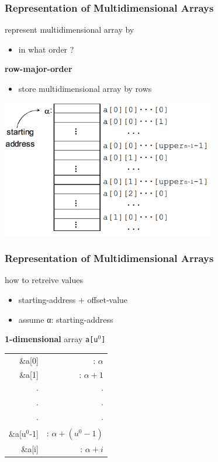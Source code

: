 \documentclass[newPxFont,sthlmFooter,nooffset]{beamer}
\begin{document}
\begin{frame}[t, fragile]
  \frametitle{Representation of Multidimensional Arrays}
represent multidimensional array by
\begin{itemize}
\item in what order ?
\end{itemize}


\textbf{row-major-order}
\begin{itemize}
\item store multidimensional array by rows
\end{itemize}
\includegraphics[width=0.7\textwidth]{figures/fig01_multi_dim.png}
\end{frame}


\begin{frame}[t, fragile]
  \frametitle{Representation of Multidimensional Arrays}
how to retreive values
\begin{itemize}
\item starting-address + offset-value
\item assume α: starting-address
\end{itemize}

\textbf{1-dimensional} array \texttt{a[u$^0$]}

\begin{center}
  \begin{tabular}{r r} \hline
    \&a[0] & : $\alpha$ \\
    \&a[1] & : $\alpha + 1$ \\[-0.5em]
    $\cdot$ & $\cdot$ \\[-0.5em]
    $\cdot$ & $\cdot$ \\[-0.5em]
    $\cdot$ & $\cdot$ \\
    \&a[u$^0$-1] & : $\alpha + (u^0 -1)$ \\ \hline
    \&a[i] & : $\alpha + i$ \\
  \end{tabular}
\end{center}
\end{frame}
\end{document}
